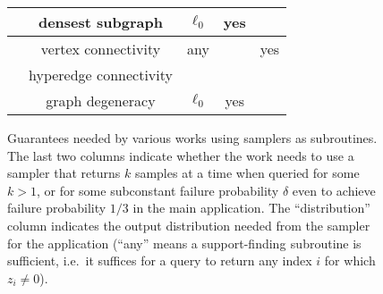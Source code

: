 \documentclass[11pt]{article}
\newcommand{\suppfind}[1]{support-finding$_{{#1}}$}
\begin{document}
\begin{figure}
\begin{center}
\begin{tabular}{|c|c|c|c|c|}
\hline
\cite{EsfandiariHW16} & densest subgraph & $\ell_0$ & yes & \\
\hline
\cite{GuhaMT15} & vertex connectivity & any & & yes\\
 & hyperedge connectivity &  & & \\
\hline
\cite{FarachColtonT16} & graph degeneracy & $\ell_0$ & yes & \\
\hline
\end{tabular}
\caption{Guarantees needed by various works using samplers as subroutines. The last two columns indicate whether the work needs to use a sampler that returns $k$ samples at a time when queried for some $k>1$, or for some subconstant failure probability $\delta$ even to achieve failure probability $1/3$ in the main application. The ``distribution'' column indicates the output distribution needed from the sampler for the application (``any'' means a \suppfind{} subroutine is sufficient, i.e.\ it suffices for a query to return any index $i$ for which $z_i\neq 0$).}\label{fig:table}
\end{center}
\end{figure}
\end{document}
